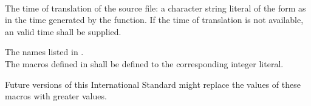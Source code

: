 \begin{description}
%
\item {}\\
The time of translation of the source file:
a character string literal of the form
as in the time generated by the
function.
If the time of translation is not available,
an  valid time shall be supplied.

\item The names listed in .\\
The macros defined in  shall be defined to
the corresponding integer literal.
\begin{note}
Future versions of this International Standard might replace
the values of these macros with greater values.
\end{note}
\end{description}

